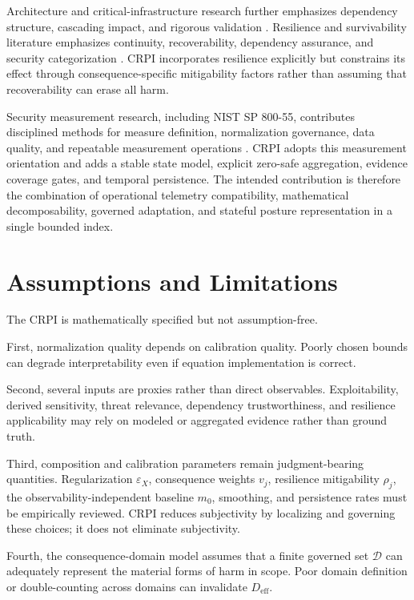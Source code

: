 \documentclass[11pt]{article}
\begin{document}
Architecture and critical-infrastructure research further emphasizes dependency
structure, cascading impact, and rigorous validation
\cite{jiang-jeusfeld-mosaad-oo,ci-resilience-review}. Resilience and survivability
literature emphasizes continuity, recoverability, dependency assurance, and security
categorization \cite{fips199,nist80039,iso27001,ci-resilience-review}. CRPI incorporates
resilience explicitly but constrains its effect through consequence-specific
mitigability factors rather than assuming that recoverability can erase all harm.

Security measurement research, including NIST SP 800-55, contributes disciplined
methods for measure definition, normalization governance, data quality, and repeatable
measurement operations \cite{nist80055v1,nist80055v2}. CRPI adopts this measurement
orientation and adds a stable state model, explicit zero-safe aggregation, evidence
coverage gates, and temporal persistence. The intended contribution is therefore the
combination of operational telemetry compatibility, mathematical decomposability,
governed adaptation, and stateful posture representation in a single bounded index.

\section{Assumptions and Limitations}
\label{sec:limitations}
The CRPI is mathematically specified but not assumption-free.

First, normalization quality depends on calibration quality. Poorly chosen bounds can
degrade interpretability even if equation implementation is correct.

Second, several inputs are proxies rather than direct observables. Exploitability,
derived sensitivity, threat relevance, dependency trustworthiness, and resilience
applicability may rely on modeled or aggregated evidence rather than ground truth.

Third, composition and calibration parameters remain judgment-bearing quantities.
Regularization $\varepsilon_X$, consequence weights $v_j$, resilience mitigability
$\rho_j$, the observability-independent baseline $m_0$, smoothing, and persistence rates
must be empirically reviewed. CRPI reduces subjectivity by localizing and governing these
choices; it does not eliminate subjectivity.

Fourth, the consequence-domain model assumes that a finite governed set
$\mathcal{D}$ can adequately represent the material forms of harm in scope. Poor domain
definition or double-counting across domains can invalidate $D_{\mathrm{eff}}$.
\end{document}
